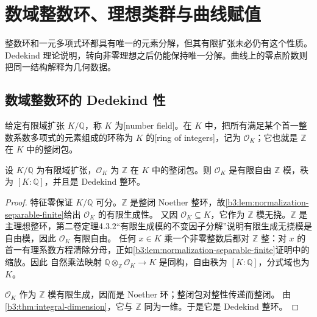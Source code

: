 
\section{数域整数环、理想类群与曲线赋值}
\label{b3:sec:1004}

整数环和一元多项式环都具有唯一的元素分解，但其有限扩张未必仍有这个性质。Dedekind 理论说明，转向非零理想之后仍能保持唯一分解。曲线上的零点阶数则把同一结构解释为几何数据。


\subsection{数域整数环的 Dedekind 性}
\label{b3:subsec:1004:01}

\begin{definition}\label{b3:def:number-field-integers}
	给定有限域扩张 \(K/\mathbb Q\)，称 \(K\) 为[number field]。在 \(K\) 中，把所有满足某个首一整数系数多项式的元素组成的环称为 \(K\) 的[ring of integers]，记为 \(\mathcal O_K\)；它也就是 \(\mathbb Z\) 在 \(K\) 中的整闭包。
\end{definition}

\begin{theorem}\label{b3:thm:number-integers-dedekind}
	设 \(K/\mathbb Q\) 为有限域扩张，\(\mathcal O_K\) 为 \(\mathbb Z\) 在 \(K\) 中的整闭包。则 \(\mathcal O_K\) 是有限自由 \(\mathbb Z\) 模，秩为 \([K:\mathbb Q]\)，并且是 Dedekind 整环。
\end{theorem}
\begin{proof}
	特征零保证 \(K/\mathbb Q\) 可分。\(\mathbb Z\) 是整闭 Noether 整环，故\cref{b3:lem:normalization-separable-finite}给出 \(\mathcal O_K\) 的有限生成性。
	又因 \(\mathcal O_K\subseteq K\)，它作为 \(\mathbb Z\) 模无挠。\(\mathbb Z\) 是主理想整环，第二卷定理4.3.2“有限生成模的不变因子分解”说明有限生成无挠模是自由模，因此 \(\mathcal O_K\) 有限自由。 任何 \(x\in K\) 乘一个非零整数后都对 \(\mathbb Z\) 整：对 \(x\) 的首一有理系数方程清除分母，正如\cref{b3:lem:normalization-separable-finite}证明中的缩放。因此 自然乘法映射 \(\mathbb Q\otimes_{\mathbb Z}\mathcal O_K\to K\) 是同构，自由秩为 \([K:\mathbb Q]\)，分式域也为 \(K\)。

	\(\mathcal O_K\) 作为 \(\mathbb Z\) 模有限生成，因而是 Noether 环；整闭包对整性传递而整闭。 由\cref{b3:thm:integral-dimension}，它与 \(\mathbb Z\) 同为一维。于是它是 Dedekind 整环。
\end{proof}

